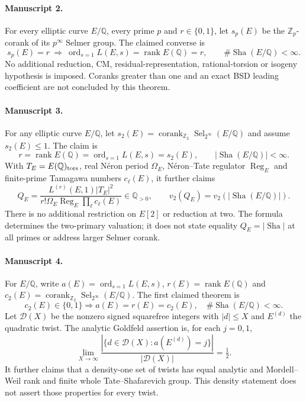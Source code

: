 \documentclass[11pt]{article}
\begin{document}
\paragraph{Manuscript 2.}
For every elliptic curve $E/\mathbb Q$, every prime $p$ and $r\in\{0,1\}$, let $s_p(E)$ be the $\mathbb Z_p$-corank of its $p^{\infty}$ Selmer group. The claimed converse is
\[
 s_p(E)=r\ \Longrightarrow\ \operatorname{ord}_{s=1}L(E,s)=\operatorname{rank}E(\mathbb Q)=r,
 \qquad\#\operatorname{Sha}(E/\mathbb Q)<\infty.
\]
No additional reduction, CM, residual-representation, rational-torsion or isogeny hypothesis is imposed. Coranks greater than one and an exact BSD leading coefficient are not concluded by this theorem.

\paragraph{Manuscript 3.}
For any elliptic curve $E/\mathbb Q$, let $s_2(E)=\operatorname{corank}_{\mathbb Z_2}\operatorname{Sel}_{2^{\infty}}(E/\mathbb Q)$ and assume $s_2(E)\le1$. The claim is
\[
 r=\operatorname{rank}E(\mathbb Q)=\operatorname{ord}_{s=1}L(E,s)=s_2(E),
 \qquad |\operatorname{Sha}(E/\mathbb Q)|<\infty.
\]
With $T_E=E(\mathbb Q)_{\rm tors}$, real N\'eron period $\Omega_E$, N\'eron--Tate regulator $\operatorname{Reg}_E$ and finite-prime Tamagawa numbers $c_{\ell}(E)$, it further claims
\[
 Q_E=\frac{L^{(r)}(E,1)|T_E|^2}{r!\Omega_E\operatorname{Reg}_E\prod_{\ell} c_{\ell}(E)}
 \in\mathbb Q_{>0},\qquad v_2(Q_E)=v_2(|\operatorname{Sha}(E/\mathbb Q)|).
\]
There is no additional restriction on $E[2]$ or reduction at two. The formula determines the two-primary valuation; it does not state equality $Q_E=|\operatorname{Sha}|$ at all primes or address larger Selmer corank.

\paragraph{Manuscript 4.}
For $E/\mathbb Q$, write $a(E)=\operatorname{ord}_{s=1}L(E,s)$, $r(E)=\operatorname{rank}E(\mathbb Q)$ and $c_2(E)=\operatorname{corank}_{\mathbb Z_2}\operatorname{Sel}_{2^{\infty}}(E/\mathbb Q)$. The first claimed theorem is
\[
 c_2(E)\in\{0,1\}\Rightarrow a(E)=r(E)=c_2(E),\quad\#\operatorname{Sha}(E/\mathbb Q)<\infty.
\]
Let $\mathcal D(X)$ be the nonzero signed squarefree integers with $|d|\le X$ and $E^{(d)}$ the quadratic twist. The analytic Goldfeld assertion is, for each $j=0,1$,
\[
 \lim_{X\to\infty}\frac{|\{d\in\mathcal D(X):a(E^{(d)})=j\}|}{|\mathcal D(X)|}=\tfrac12.
\]
It further claims that a density-one set of twists has equal analytic and Mordell--Weil rank and finite whole Tate--Shafarevich group. This density statement does not assert those properties for every twist.
\end{document}
